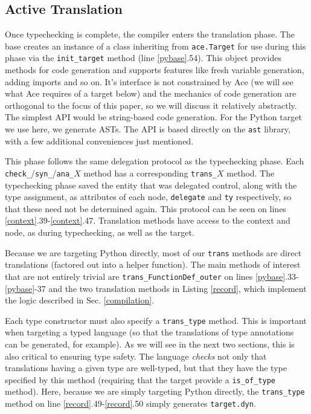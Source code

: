 {\subsection{Active Translation}
Once typechecking is complete, the compiler enters the translation phase. The base creates an instance of a class inheriting from \verb|ace.Target| for use during this phase via the \verb|init_target| method (line \ref{pybase}.54). This object provides methods for code generation and supports features like fresh variable generation, adding imports and so on. It's interface is not constrained by Ace (we will see what Ace requires of a target below) and the mechanics of code generation are orthogonal to the  focus of this paper, so we will discuss it relatively abstractly. The simplest API would be string-based code generation. For the Python target we use here, we generate ASTs. The API is based directly on the \verb|ast| library, with a few additional conveniences just mentioned.

This phase follows the same delegation protocol as the typechecking phase. Each \verb|check_|/\verb|syn_|/\verb|ana_|$X$  method has a corresponding \verb|trans_|$X$ method. The typechecking phase saved the entity that was delegated control, along with the type assignment, as attributes of each node, \verb|delegate| and \verb|ty| respectively, so that these need not be determined again. This protocol can be seen on lines \ref{context}.39-\ref{context}.47. 
Translation methods have access to the context and node, as during typechecking, as well as the target. 

Because we are targeting Python directly, most of our \verb|trans| methods are direct translations (factored out into a helper function). The main methods of interest that are not entirely trivial are \verb|trans_FunctionDef_outer| on lines \ref{pybase}.33-\ref{pybase}-37 and the two translation methods in Listing \ref{record}, which implement the logic described in Sec. \ref{compilation}. 

Each type constructor must also specify a \verb|trans_type| method. This is important when targeting a typed language (so that the translations of type annotations can be generated, for example). As we will see in the next two sections, this is also critical to ensuring type safety. The language \emph{checks} not only that translations having a given type are well-typed, but that they have the type specified by this method (requiring that the target provide a \verb|is_of_type| method). Here, because we are simply targeting Python directly, the \verb|trans_type| method on line \ref{record}.49-\ref{record}.50 simply generates \verb|target.dyn|. 

}
